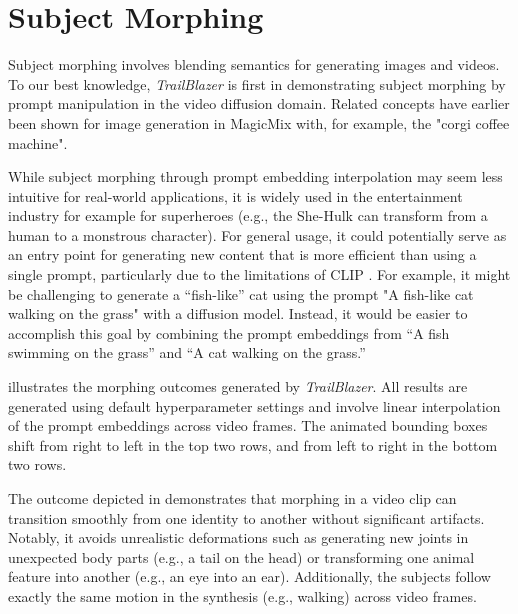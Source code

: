 \newpage
\section{Subject Morphing}
\label{sec:morphing}




Subject morphing involves blending semantics for generating images and videos. To our best knowledge, \textit{TrailBlazer} is  first in demonstrating subject morphing by prompt manipulation in the video diffusion domain. Related concepts have earlier been shown for image generation in MagicMix \cite{Magicmix} with, for example, the "corgi coffee machine".

While subject morphing through prompt embedding interpolation may seem less intuitive for real-world applications, it is widely used in the entertainment industry for example for superheroes (e.g., the She-Hulk can transform from a human to a monstrous character). For general usage, it could potentially serve as an entry point for generating new content that is more efficient than using a single prompt, particularly due to the limitations of CLIP \cite{CLIP}. For example, it might be challenging to generate a ``fish-like'' cat using the prompt "A fish-like cat walking on the grass" with a diffusion model. Instead, it would be easier to accomplish this goal by combining the prompt embeddings from ``A fish swimming on the grass'' and ``A cat walking on the grass.''

 illustrates the morphing outcomes generated by \textit{TrailBlazer}. All results are generated using default hyperparameter settings and involve linear interpolation of the prompt embeddings across video frames. The animated bounding boxes shift from right to left in the top two rows, and from left to right in the bottom two rows.

The outcome depicted in  demonstrates that morphing in a video clip can transition smoothly from one identity to another without significant artifacts. Notably, it avoids unrealistic deformations such as generating new joints in unexpected body parts (e.g., a tail on the head) or transforming one animal feature into another (e.g., an eye into an ear). Additionally, the subjects follow exactly the same motion in the synthesis (e.g., walking) across video frames.

